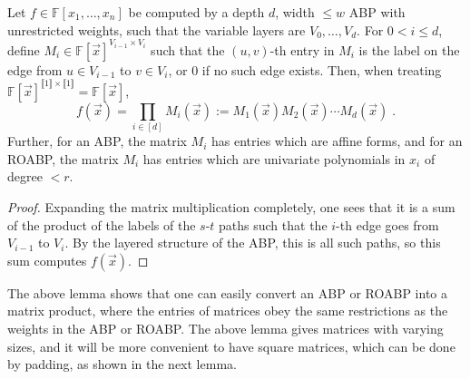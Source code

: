 \documentclass[letterpaper,11pt]{article}
\numberwithin{equation}{section}
\theoremstyle{plain}
\theoremstyle{remark}
\newcommand{\zr}[1]{{\llbracket {#1}\rrbracket}}
\newcommand{\F}{\mathbb{F}}
\newcommand{\eqdef}{:=}
\begin{document}
\begin{lemma}
	\label{roabpadj}
	Let $f\in\F[x_1,\ldots,x_n]$ be computed by a depth $d$, width $\le w$ ABP with unrestricted weights, such that the variable layers are $V_0,\ldots,V_d$.  For $0<i\le d$, define $M_i\in\F[\vec{x}]^{V_{i-1}\times V_i}$ such that the $(u,v)$-th entry in $M_i$ is the label on the edge from $u\in V_{i-1}$ to $v\in V_i$, or 0 if no such edge exists. Then, when treating $\F[\vec{x}]^{\zr{1}\times\zr{1}}=\F[\vec{x}]$, \[f(\vec{x})=\prod_{i\in[d]} M_i(\vec{x})\eqdef M_1(\vec{x}) M_2(\vec{x})\cdots M_d(\vec{x})\;.\]
	Further, for an ABP, the matrix $M_i$ has entries which are affine forms, and for an ROABP, the matrix $M_i$ has entries which are univariate polynomials in $x_i$ of degree $<r$.
\end{lemma}
\begin{proof}
	Expanding the matrix multiplication completely, one sees that it is a sum of the product of the labels of the $s$-$t$ paths such that the $i$-th edge goes from $V_{i-1}$ to $V_i$.  By the layered structure of the ABP, this is all such paths, so this sum computes $f(\vec{x})$.
\end{proof}

The above lemma shows that one can easily convert an ABP or ROABP into a matrix product, where the entries of matrices obey the same restrictions as the weights in the ABP or ROABP.  The above lemma gives matrices with varying sizes, and it will be more convenient to have square matrices, which can be done by padding, as shown in the next lemma.
\end{document}
